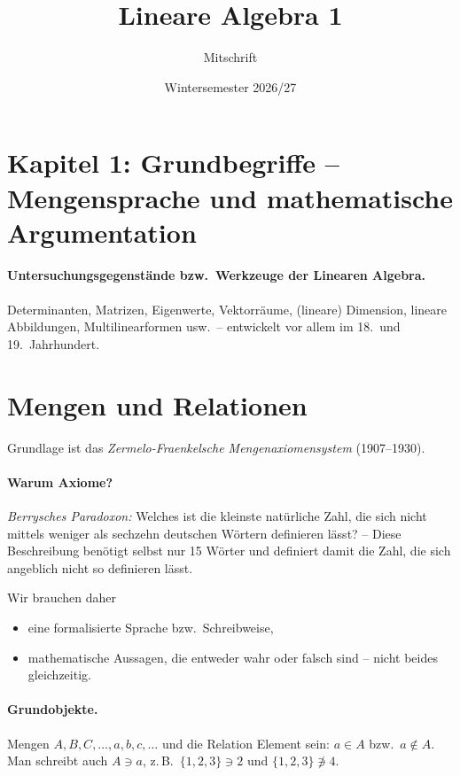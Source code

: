 \documentclass[a4paper]{article}
\title{Lineare Algebra 1}
\author{Mitschrift}
\date{Wintersemester 2026/27}
\theoremstyle{kurzskript}
\begin{document}
\maketitle
\tableofcontents
\newpage

\section*{Kapitel 1: Grundbegriffe -- Mengensprache und mathematische Argumentation}

\paragraph{Untersuchungsgegenstände bzw.\ Werkzeuge der Linearen Algebra.}
Determinanten, Matrizen, Eigenwerte, Vektorräume, (lineare) Dimension, lineare Abbildungen, Multilinearformen usw.\ -- entwickelt vor allem im 18.\ und 19.~Jahrhundert.

\section{Mengen und Relationen}

Grundlage ist das \emph{Zermelo-Fraenkelsche Mengenaxiomensystem} (1907--1930).

\paragraph{Warum Axiome?}
\emph{Berrysches Paradoxon:} \glqq Welches ist die kleinste natürliche Zahl, die sich nicht mittels weniger als sechzehn deutschen Wörtern definieren lässt?\grqq{} -- Diese Beschreibung benötigt selbst nur 15 Wörter und definiert damit die Zahl, die sich angeblich nicht so definieren lässt.

Wir brauchen daher
\begin{itemize}
  \item eine formalisierte Sprache bzw.\ Schreibweise,
  \item mathematische Aussagen, die entweder wahr oder falsch sind -- nicht beides gleichzeitig.
\end{itemize}

\paragraph{Grundobjekte.}
Mengen $A, B, C, \dots, a, b, c, \dots$ und die Relation \glqq Element sein\grqq: $a \in A$ bzw.\ $a \notin A$. Man schreibt auch $A \ni a$, z.\,B.\ $\{1, 2, 3\} \ni 2$ und $\{1, 2, 3\} \not\ni 4$.
\end{document}
